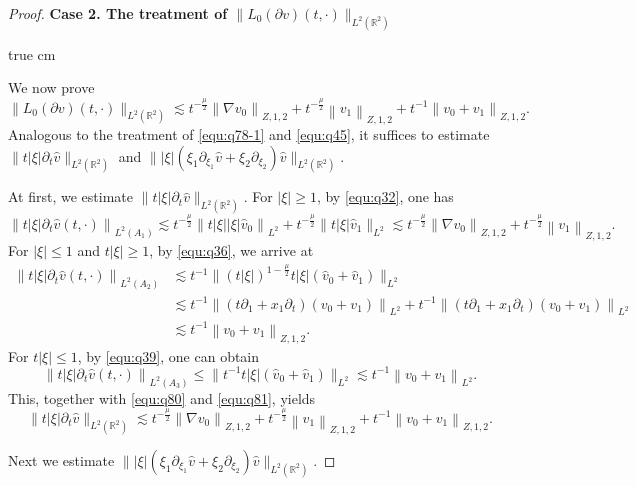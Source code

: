 \documentclass[10pt,a4paper]{amsart}
\newcommand{\R}{\mathbb R}
\newcommand{\f}{\frac}
\newcommand{\p}{\partial}
\begin{document}
\begin{proof}
{\bf Case 2.  The treatment of $\|L_0(\p v)(t, \cdot)\|_{L^2(\R^2)}$}

 true cm

We now prove
\begin{equation}\label{equ:q79}
\|L_0(\p v)(t, \cdot)\|_{L^2(\R^2)} \lesssim t^{-\f{\mu}{2}}\left\|\nabla v_0\right\|_{Z, 1, 2}
+t^{-\f{\mu}{2}}\left\|v_1\right\|_{Z, 1,2}+t^{-1}\left\|v_0+v_1\right\|_{Z, 1, 2}.
\end{equation}
Analogous to the treatment of \eqref{equ:q78-1} and \eqref{equ:q45}, it suffices to estimate  $\|t|\xi|\p_t\hat{v}\|_{L^2(\R^2)}$ and $\||\xi|(\xi_1\p_{\xi_1}\hat{v}+\xi_2\p_{\xi_2})\hat{v}\|_{L^2(\R^2)}$.

At first, we estimate $\|t|\xi|\p_t\hat{v}\|_{L^2(\R^2)}$. For $|\xi|\geq1$,  by \eqref{equ:q32}, one has
\begin{equation}\label{equ:q80}
\left\|t|\xi|\p_t\hat{v}(t, \cdot)\right\|_{L^2(A_1)}
 \lesssim t^{-\frac{\mu}{2}}\left\|t|\xi||\xi|\hat{v}_{0}\right\|_{L^{2}}+t^{-\f{\mu}{2}} \|t|\xi|\hat{v}_{1}\|_{L^{2}} \lesssim t^{-\f{\mu}{2}}\left\|\nabla v_0\right\|_{Z,1,2}+t^{-\f{\mu}{2}}\left\|v_1\right\|_{Z,1,2}.
\end{equation}
For $|\xi|\leq1$ and $t|\xi|\geq1$,  by  \eqref{equ:q36}, we arrive at
\begin{equation}\label{equ:q81}
\begin{aligned}
\left\|t|\xi|\p_t\hat{v}(t, \cdot)\right\|_{L^2(A_2)}
&\lesssim t^{-1}\big\|(t|\xi|)^{1-\f{\mu}{2}}t|\xi|(\hat{v}_{0}+\hat{v}_{1})\big\|_{L^2}\\
& \lesssim  t^{-1}\left\|(t\p_1+x_1\p_t)(v_{0}+v_1)\right\|_{L^{2}}+ t^{-1}\left\|(t\p_1+x_1\p_t)(v_0+v_{1})\right\|_{L^2}\\
&\lesssim t^{-1}\left\|v_{0}+v_{1}\right\|_{Z, 1, 2}.
\end{aligned}
\end{equation}
For  $t|\xi|\leq1$,  by  \eqref{equ:q39}, one can obtain
$$
\left\|t|\xi|\p_t\hat{v}(t, \cdot)\right\|_{L^2(A_3)}  \leq\big\|t^{-1}t|\xi|(\hat{v}_{0}+\hat{v}_{1})\big\|_{L^{2}}
\lesssim t^{-1}\left\|v_{0}+v_{1}\right\|_{L^ 2}.
$$
This, together with \eqref{equ:q80} and \eqref{equ:q81}, yields
\begin{equation}\label{equ:q82}
\|t|\xi|\p_t\hat{v}\|_{L^2(\R^2)}\lesssim t^{-\f{\mu}{2}}\left\|\nabla v_0\right\|_{Z, 1, 2}
+t^{-\f{\mu}{2}}\left\|v_1\right\|_{Z, 1,2}+t^{-1}\left\|v_0+v_1\right\|_{Z, 1, 2}.
\end{equation}


Next we estimate  $\||\xi|(\xi_1\p_{\xi_1}\hat{v}+\xi_2\p_{\xi_2})\hat{v}\|_{L^2(\R^2)}$.


\end{proof}
\end{document}
